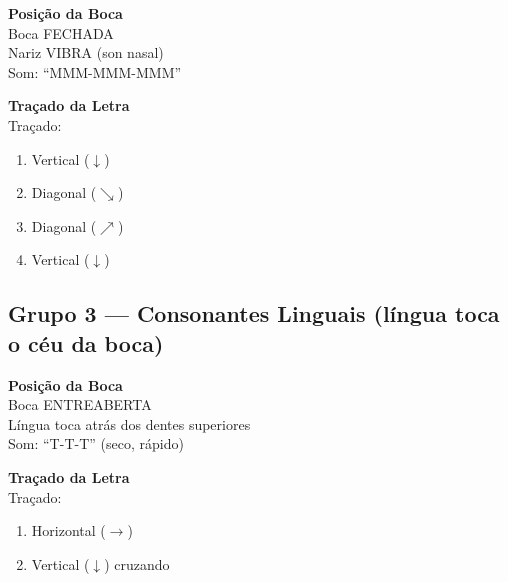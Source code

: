 \begin{boquinha}
\begin{minipage}{0.45\textwidth}
\centering
\textbf{Posição da Boca}\\[0.5em]
Boca FECHADA\\
Nariz VIBRA (son nasal)\\
Som: ``MMM-MMM-MMM''
\end{minipage}
\hfill
\begin{minipage}{0.45\textwidth}
\centering
\textbf{Traçado da Letra}\\[0.5em]
Traçado:
\begin{enumerate}
  \item Vertical ($\downarrow$)
  \item Diagonal ($\searrow$)
  \item Diagonal ($\nearrow$)
  \item Vertical ($\downarrow$)
\end{enumerate}
\end{minipage}
\end{boquinha}

\subsection{Grupo 3 --- Consonantes Linguais (língua toca o céu da boca)}

\begin{boquinha}
\begin{minipage}{0.45\textwidth}
\centering
\textbf{Posição da Boca}\\[0.5em]
Boca ENTREABERTA\\
Língua toca atrás dos dentes superiores\\
Som: ``T-T-T'' (seco, rápido)
\end{minipage}
\hfill
\begin{minipage}{0.45\textwidth}
\centering
\textbf{Traçado da Letra}\\[0.5em]
Traçado:
\begin{enumerate}
  \item Horizontal ($\rightarrow$)
  \item Vertical ($\downarrow$) cruzando
\end{enumerate}
\end{minipage}
\end{boquinha}


